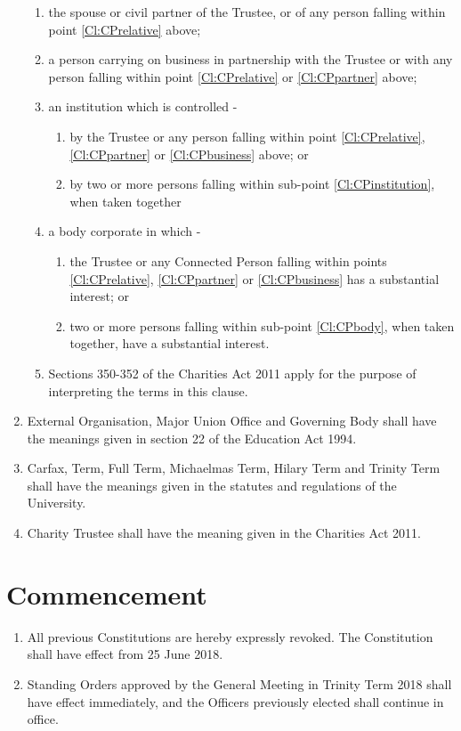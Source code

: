 \documentclass[11pt,a4paper, oneside]{memoir}
\begin{document}
\begin{enumerate}
\begin{enumerate}
			\item \label{Cl:CPpartner} the spouse or civil partner of the Trustee, or of any person falling within point \ref{Cl:CPrelative} above;
			\item \label{Cl:CPbusiness} a person carrying on business in partnership with the Trustee or with any person falling within point \ref{Cl:CPrelative} or \ref{Cl:CPpartner} above;
			\item an institution which is controlled -
			\begin{enumerate}
				\item \label{Cl:CPinstitution} by the Trustee or any person falling within point \ref{Cl:CPrelative}, \ref{Cl:CPpartner} or \ref{Cl:CPbusiness} above; or
				\item by two or more persons falling within sub-point \ref{Cl:CPinstitution}, when taken together
			\end{enumerate}
			\item a body corporate in which -
			\begin{enumerate}
				\item \label{Cl:CPbody} the Trustee or any Connected Person falling within points \ref{Cl:CPrelative}, \ref{Cl:CPpartner} or \ref{Cl:CPbusiness}  has a substantial interest; or
				\item two or more persons falling within sub-point \ref{Cl:CPbody}, when taken together, have a substantial interest.
			\end{enumerate}
			\item Sections 350-352 of the Charities Act 2011 apply for the purpose of interpreting the terms in this clause.
		\end{enumerate}
		\item External Organisation, Major Union Office and Governing Body shall have the meanings given in section 22 of the Education Act 1994.
		\item Carfax, Term, Full Term, Michaelmas Term, Hilary Term and Trinity Term shall have the meanings given in the statutes and regulations of the University.
		\item Charity Trustee shall have the meaning given in the Charities Act 2011.
	\end{enumerate}
	\section{Commencement}
	\begin{enumerate}
		\item All previous Constitutions are hereby expressly revoked.  The Constitution shall have effect from 25 June 2018.
		\item Standing Orders approved by the General Meeting in Trinity Term 2018 shall have effect immediately, and the Officers previously elected shall continue in office.
	\end{enumerate}
\end{document}
